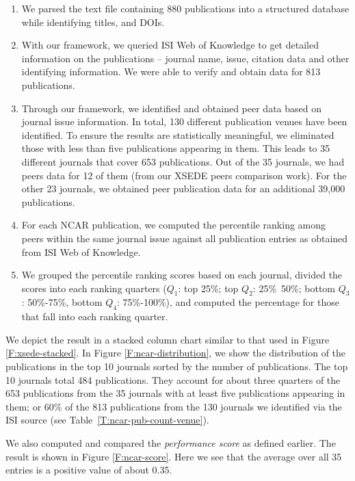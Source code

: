 \documentclass{sig-alternate}
\begin{document}
\begin{enumerate}

\item We parsed the text file containing 880 publications into a structured database while identifying titles, and DOIs.

\item With our framework, we queried ISI Web of Knowledge to get detailed information on the publications -- journal name, issue, citation data and other identifying information. We were able to verify and obtain data for 813 publications.

\item Through our framework, we identified and obtained peer data based on journal issue information. In total, 130 different publication venues have been identified. To ensure the results are statistically meaningful, we eliminated those with less than five publications appearing in them.  This leads to 35 different journals that cover 653 publications. Out of the 35 journals, we had peers data for 12 of them (from our XSEDE peers comparison work). For the other 23 journals, we obtained peer publication data for an additional 39,000 publications.

\item For each NCAR publication, we computed the percentile ranking among peers within the same journal issue against all publication entries as obtained from ISI Web of Knowledge.

\item We grouped the percentile ranking scores based on each journal, divided the scores into each ranking quarters ($Q_1$: top 25\%; top $Q_2$: 25\%~50\%; bottom $Q_3$: 50\%-75\%, bottom $Q_4$: 75\%-100\%), and computed the percentage for those that fall into each ranking quarter.

\end{enumerate}

We depict the result in a stacked column chart similar to that used in Figure \ref{F:xsede-stacked}.  In Figure \ref{F:ncar-distribution}, we show the distribution of the publications in the top 10 journals sorted by the number of publications. The top 10 journals total 484 publications. They account for about three quarters of the 653 publications from the 35 journals with at least five publications appearing in them; or 60\% of the 813 publications from the 130 journals we identified via the ISI source (see Table~\ref{T:ncar-pub-count-venue}).

We also computed and compared the \emph{performance score} as defined earlier. The result is shown in Figure \ref{F:ncar-score}. Here we see that the average over all 35 entries is a positive value of about 0.35. 
\end{document}
